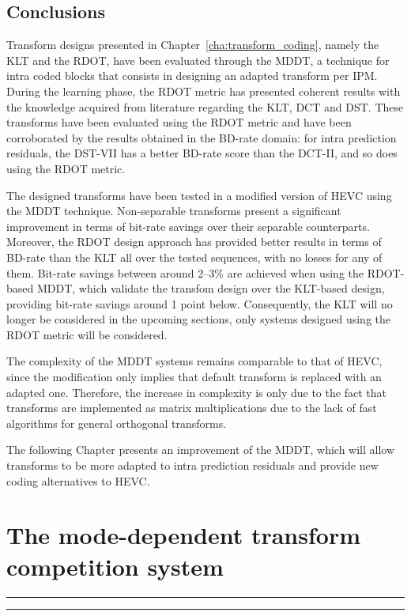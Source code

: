 \documentclass[11pt,a4paper,openright,twoside]{book}
\providecommand{\chaptertoc}{
	\startcontents[chapters]
	\hrule
	\vspace{1em}
	\printcontents[chapters]{}{1}{{\sf\large\bfseries Contents}}
	\vspace{1em}
	\hrule
}
\numberwithin{equation}{section} %
\numberwithin{figure}{section} %
\numberwithin{table}{section} %
\begin{document}
\section{Conclusions}
\label{sec:mddt_conclusions}

Transform designs presented in Chapter~\ref{cha:transform_coding}, namely the
\ac{KLT} and the \ac{RDOT}, have been evaluated through the \ac{MDDT}, a
technique for intra coded blocks that consists in designing an adapted
transform per \ac{IPM}.
During the learning phase, the \ac{RDOT} metric has presented coherent results
with the knowledge acquired from literature regarding the \ac{KLT}, \ac{DCT}
and \ac{DST}.
These transforms have been evaluated using the \ac{RDOT} metric and have been
corroborated by the results obtained in the \ac{BD}-rate domain:
for intra prediction residuals, the \ac{DST}-VII has a better \ac{BD}-rate
score than the \ac{DCT}-II, and so does using the \ac{RDOT} metric.

The designed transforms have been tested in a modified version of \ac{HEVC}
using the \ac{MDDT} technique.
Non-separable transforms present a significant improvement in terms of
bit-rate savings over their separable counterparts.
Moreover, the \ac{RDOT} design approach has provided better results in terms
of \ac{BD}-rate than the \ac{KLT} all over the tested sequences, with no
losses for any of them.
Bit-rate savings between around 2--3\% are achieved when using the
\ac{RDOT}-based \ac{MDDT}, which validate the transfom design over the
\ac{KLT}-based design, providing bit-rate savings around 1 point below.
Consequently, the \ac{KLT} will no longer be considered in the upcoming
sections, only systems designed using the \ac{RDOT} metric will be considered.

The complexity of the \ac{MDDT} systems remains comparable to that of
\ac{HEVC}, since the modification only implies that default transform is
replaced with an adapted one.
Therefore, the increase in complexity is only due to the fact that transforms
are implemented as matrix multiplications due to the lack of fast algorithms
for general orthogonal transforms.

The following Chapter presents an improvement of the \ac{MDDT}, which will
allow transforms to be more adapted to intra prediction residuals and provide
new coding alternatives to \ac{HEVC}.

\chapter{The mode-dependent transform competition system}
\label{cha:mdtc}
\chaptertoc
\end{document}
